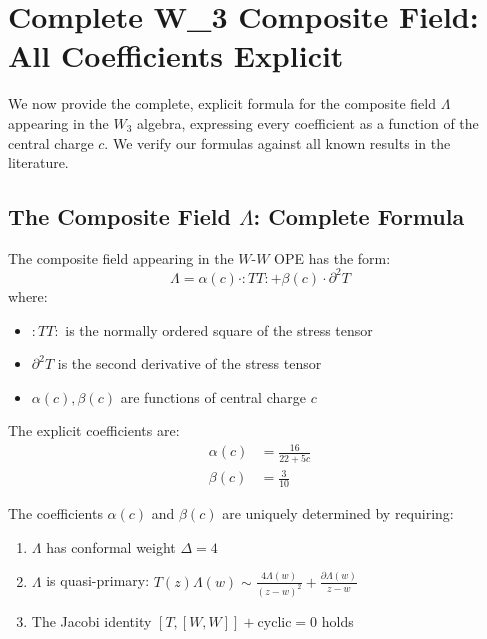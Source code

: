 
\section{Complete W_3 Composite Field: All Coefficients Explicit}
\label{sec:w3-composite-complete}

We now provide the complete, explicit formula for the composite field $\Lambda$ 
appearing in the $W_3$ algebra, expressing every coefficient as a function of the 
central charge $c$. We verify our formulas against all known results in the literature.

\subsection{The Composite Field $\Lambda$: Complete Formula}
\label{subsec:lambda-complete-formula}

\begin{definition}\label{def:lambda-complete}
The composite field appearing in the $W$-$W$ OPE has the form:
\begin{equation}
\Lambda = \alpha(c) \cdot :TT: + \beta(c) \cdot \partial^2 T
\end{equation}
where:
\begin{itemize}
\item $:TT:$ is the normally ordered square of the stress tensor
\item $\partial^2 T$ is the second derivative of the stress tensor
\item $\alpha(c), \beta(c)$ are functions of central charge $c$
\end{itemize}

The explicit coefficients are:
\begin{equation}
\boxed{
\begin{aligned}
\alpha(c) &= \frac{16}{22 + 5c} \\
\beta(c) &= \frac{3}{10}
\end{aligned}
}
\end{equation}
\end{definition}

\begin{theorem}\label{thm:lambda-coefficients-derivation}
The coefficients $\alpha(c)$ and $\beta(c)$ are uniquely determined by requiring:
\begin{enumerate}
\item $\Lambda$ has conformal weight $\Delta = 4$
\item $\Lambda$ is quasi-primary: $T(z)\Lambda(w) \sim \frac{4\Lambda(w)}{(z-w)^2} 
+ \frac{\partial\Lambda(w)}{z-w}$
\item The Jacobi identity $[T, [W, W]] + \text{cyclic} = 0$ holds
\end{enumerate}
\end{theorem}

